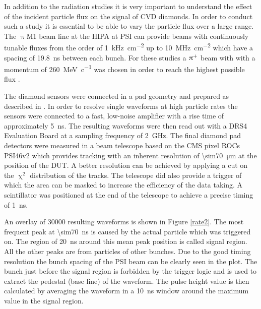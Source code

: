 In addition to the radiation studies it is very important to understand the effect of the incident particle flux on the signal of \ac{CVD} diamonds.
In order to conduct such a study it is essential to be able to vary the particle flux over a large range. The $\uppi$M1 beam line at the \ac{HIPA} at \ac{PSI} \cite{hipa} can provide beams with continuously tunable fluxes from the order of \SI{1}{\kilo\hertz\per\centi\meter^2} up to \SI{10}{\mega\hertz\per\centi\meter^2} which have a spacing of \SI{19.8}{\nano\second} between each bunch. For these studies a $\uppi^{\text{+}}$ beam with with a momentum of \SI{260}{\mega\electronvolt\per c}  was chosen in order to reach the highest possible flux \cite{pim1}.\par
The diamond sensors were connected in a pad geometry and prepared as described in \cite{rainer}. 
In order to resolve single waveforms at high particle rates the sensors were connected to a fast, low-noise amplifier with a rise time of approximately \SI{5}{\nano\second}. The resulting waveforms were then read out with a DRS4 Evaluation Board at a sampling frequency of \SI{2}{\giga\hertz}. The final diamond pad detectors were measured in a beam telescope based on the CMS pixel \acp{ROC} PSI46v2 \cite{kornmayer} which provides tracking with an inherent resolution of \SI{\sim70}{\micro\meter} at the position of the DUT. A better resolution can be achieved by applying a cut on the $\upchi^{2}$ distribution of the tracks. The telescope did also provide a trigger of which the area can be masked to increase the efficiency of the data taking. A scintillator was positioned at the end of the telescope to achieve a precise timing of \SI{1}{\nano\second}.\par
An overlay of \num{30000} resulting waveforms is shown in Figure \vref{rate2}. The most frequent peak at \SI{\sim70}{\nano\second} is caused by the actual particle which was triggered on. The region of \SI{20}{\nano\second} around this mean peak position is called signal region. All the other peaks are from particles of other bunches. Due to the good timing resolution the bunch spacing of the \ac{PSI} beam can be clearly seen in the plot. The bunch just before the signal region is forbidden by the trigger logic and is used to extract the pedestal (base line) of the waveform. The pulse height value is then calculated by averaging the waveform in a \SI{10}{\nano\second} window around the maximum value in the signal region.\par

